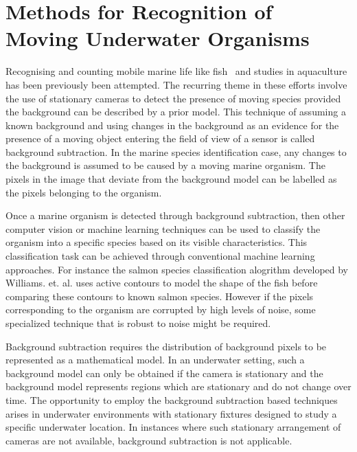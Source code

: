 \documentclass {udthesis}
\begin{document}

\section{Methods for Recognition of Moving Underwater Organisms}

Recognising and counting mobile marine life like fish~\cite{spampinato, edgington, williams} and studies in aquaculture \cite{zion} has been previously been attempted. The recurring theme in these efforts involve the use of stationary cameras to detect the presence of moving species provided the background can be described by a prior model. This technique of assuming a known background and using changes in the background as an evidence for the presence of a moving object entering the field of view of a sensor is called background subtraction. In the marine species identification case, any changes to the background is assumed to be caused by a moving marine organism. The pixels in the image that deviate from the background model can be labelled as the pixels belonging to the organism.

Once a marine organism is detected through background subtraction, then other computer vision or machine learning techniques can be used to classify the organism into a specific species based on its visible characteristics. This classification task can be achieved through conventional machine learning approaches. For instance the salmon species classification alogrithm developed by Williams. et. al. \cite{williams} uses active contours to model the shape of the fish before comparing these contours to known salmon species. However if the pixels corresponding to the organism are corrupted by high levels of noise, some specialized technique that is robust to noise might be required.

Background subtraction requires the distribution of background pixels to be represented as a mathematical model. In an underwater setting, such a background model can only be obtained if the camera is stationary and the background model represents regions which are stationary and do not change over time. The opportunity to employ the background subtraction based techniques arises in underwater environments with stationary fixtures designed to study a specific underwater location. In instances where such stationary arrangement of cameras are not available, background subtraction is not applicable.
\end{document}
